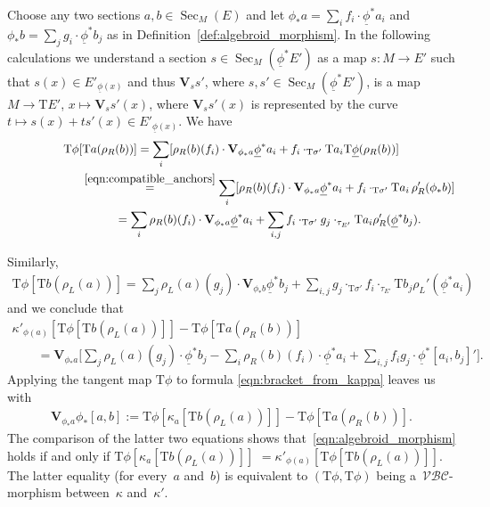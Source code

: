 \documentclass[pdftex]{sigma}
\newcommand{\und}{\underline}
\newcommand{\Sec}{\operatorname{Sec}}
\newcommand{\V}{\mathbf{V}} %
\newcommand{\ra}{\rightarrow}
\newcommand{\rhoL}{\rho_L} %
\newcommand{\rhoR}{\rho_R}
\newcommand{\T}{\mathrm{T}} %
\newcommand{\catZM}{{\mathcal{VBC}}} %
\numberwithin{equation}{section}
\theoremstyle{definition}
\begin{document}
Choose any two sections $a,b\in\Sec_M(E)$ and let $\phi_\ast a=\sum_i f_i\cdot \und{\phi}^\ast a_i$ and $\phi_\ast b=\sum_j g_i\cdot \und{\phi}^\ast b_j$ as in Definition~\ref{def:algebroid_morphism}. In the following calculations we understand a section $s\in\Sec_M(\und{\phi}^\ast E')$ as a map $s\colon M\ra E'$ such that $s(x)\in E'_{\und{\phi}(x)}$ and thus $\V_{s}{s'}$, where $s, s'\in \Sec_M(\und{\phi}^\ast E')$, is a map $M \ra \T E'$, $x\mapsto \V_s{s'}(x)$, where $\V_s{s'}(x)$ is represented by the curve $t\mapsto s(x)+ t s'(x) \in E'_{\und{\phi}(x)}$. We have
\begin{gather*}
\T\phi [\T a(\rhoR(b)) ]= \sum_i [\rhoR(b)(f_i)\cdot \V_{\phi_\ast a}\und{\phi}^\ast a_i+f_i\cdot_{\T \sigma'} \T a_i \T \und{\phi}(\rhoR(b)) ]\\
\hphantom{\T\phi [\T a(\rhoR(b)) ]}{} \overset{\eqref{eqn:compatible_anchors}}= \sum_i [\rhoR(b)(f_i)\cdot\V_{\phi_\ast a} \und{\phi}^\ast a_i+f_i \cdot_{\T\sigma'} \T a_i \, \rhoR'(\phi_\ast b) ]\\
\hphantom{\T\phi [\T a(\rhoR(b)) ]}{}=\sum_i\rhoR(b)(f_i)\cdot \V_{\phi_\ast a} \und{\phi}^\ast a_i +\sum_{i,j}f_i\cdot_{\T\sigma'}g_j\cdot_{\tau_{E'}} \T a_i \rhoR'(\und{\phi}^\ast b_j).
\end{gather*}

Similarly,
\begin{gather*}\T\phi [\T b(\rhoL(a)) ]=
\sum_j\rhoL(a)(g_j)\cdot \V_{\phi_\ast b}\und{\phi}^\ast b_j+\sum_{i,j}g_j\cdot_{\T\sigma'} f_i \cdot_{\tau_{E'}}\T b_j \rhoL'(\und{\phi}^\ast a_i)\end{gather*}
and we conclude that
\begin{gather*}
\kappa'_{\phi(a)} [\T\phi [\T b(\rhoL(a)) ] ]-\T\phi [\T a(\rhoR(b)) ] \\
\qquad{}= \V_{\phi_\ast a}\bigg[\sum_j\rhoL(a)(g_j)\cdot \und{\phi}^\ast b_j-\sum_i\rhoR(b)(f_i)\cdot
 \und{\phi}^\ast a_i +\sum_{i,j}f_ig_j\cdot\und{\phi}^\ast[a_i,b_j]'\bigg].
\end{gather*}
Applying the tangent map $\T\phi$ to formula \eqref{eqn:bracket_from_kappa} leaves us with
\begin{gather*}\V_{ \phi_\ast a}\phi_\ast[a,b]:=\T\phi [\kappa_a [\T b(\rhoL(a)) ] ]-\T\phi [\T a(\rhoR(b)) ].\end{gather*}
The comparison of the latter two equations shows that~\eqref{eqn:algebroid_morphism} holds if and only if $\T\phi [\kappa_a\! [\T b(\rhoL(a)) ] ]\!\!$ $=\kappa'_{\phi(a)} [\T\phi [\T b(\rhoL(a)) ] ]$. The latter equality (for every~$a$ and~$b$) is equivalent to $(\T\phi,\T\phi)$ being a~$\catZM$-morphism between~$\kappa$ and~$\kappa'$. %
\end{document}
